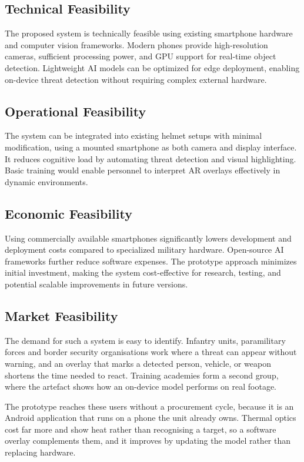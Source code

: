 \subsection{Technical Feasibility}
The proposed system is technically feasible using existing smartphone hardware and computer vision
frameworks. Modern phones provide high-resolution cameras, sufficient processing power, and GPU
support for real-time object detection. Lightweight AI models can be optimized for edge deployment,
enabling on-device threat detection without requiring complex external hardware.

\subsection{Operational Feasibility}
The system can be integrated into existing helmet setups with minimal modification, using a mounted
smartphone as both camera and display interface. It reduces cognitive load by automating threat
detection and visual highlighting. Basic training would enable personnel to interpret AR overlays
effectively in dynamic environments.

\subsection{Economic Feasibility}
Using commercially available smartphones significantly lowers development and deployment costs
compared to specialized military hardware. Open-source AI frameworks further reduce software
expenses. The prototype approach minimizes initial investment, making the system cost-effective for
research, testing, and potential scalable improvements in future versions.

\begingroup\setlength{\parskip}{6pt}
\subsection{Market Feasibility}
The demand for such a system is easy to identify. Infantry units, paramilitary forces and border
security organisations work where a threat can appear without warning, and an overlay that marks a
detected person, vehicle, or weapon shortens the time needed to react. Training academies form a
second group, where the artefact shows how an on-device model performs on real footage.

The prototype reaches these users without a procurement cycle, because it is an Android application
that runs on a phone the unit already owns. Thermal optics cost far more
and show heat rather than recognising a target, so a software overlay complements them, and it
improves by updating the model rather than replacing hardware.

